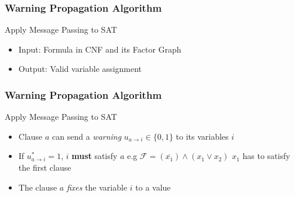 
\begin{frame}
	\frametitle{Warning Propagation Algorithm}
	Apply Message Passing to SAT
	\begin{itemize}
	\item Input: Formula in CNF and its Factor Graph
	\item Output: Valid variable assignment \newline
	      
	\end{itemize}
\end{frame}

\begin{frame}
	\frametitle{Warning Propagation Algorithm}
	Apply Message Passing to SAT
	\begin{itemize}
		\item Clause $a$ can send a \emph{warning} $u_{a\rightarrow i} \in \{0, 1\}$ to its variables $i$
		\item If $u^\ast_{a \rightarrow i} = 1$, $i$ \textbf{must} satisfy $a$ \newline e.g $\mathcal{F} = (\overline{x_1}) \land (x_1 \lor x_2)$ \newline$x_1$ has to satisfy the first clause
	
\begin{figure}[h]
\centering

\end{figure}
\item The clause $a$ \emph{fixes} the variable $i$ to a value
\end{itemize}
\end{frame}

